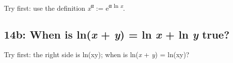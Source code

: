 \documentclass[11pt]{article}
\begin{document}
\begin{keepsection}
\begin{keepsection}
Try first: use the definition \textit{x}\textsuperscript{α} := e\textsuperscript{α ln \textit{x}}.

\end{keepsection}

\begin{keepsection}
\subsection{14b: When is ln(\textit{x} + \textit{y}) = ln \textit{x} + ln \textit{y} true?}

Try first: the right side is ln(xy); when is ln(\textit{x} + \textit{y}) = ln(xy)?

\end{keepsection}
\end{keepsection}


\clearpage
\end{document}
